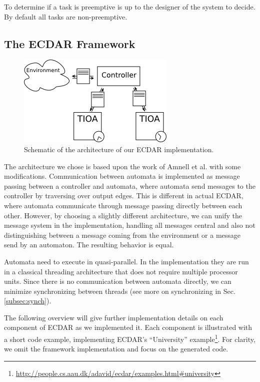 To determine if a task is preemptive is up to the designer of the
system to decide. By default all tasks are non-preemptive.

\subsection{The ECDAR Framework}
\label{implementation-framework}

\begin{figure}[t]
\begin{centering}
\includegraphics[scale=0.8]{images/ecdar_architecture_2.png}
\par\end{centering}

\caption{Schematic of the architecture of our ECDAR implementation.}
\end{figure}

The architecture we chose is based upon the work of Amnell et
al.\cite{amnell_code_2002} with some modifications. Communication between
automata is implemented as message passing between a controller and automata,
where automata send messages to the controller by traversing over output
edges. This is different in actual ECDAR, where automata communicate through
message passing directly between each other. However, by choosing a slightly
different architecture, we can unify the message system in the implementation,
handling all messages central and also not distinguishing between a message
coming from the environment or a message send by an automaton. The resulting
behavior is equal.

Automata need to execute in quasi-parallel. In the implementation they are run
in a classical threading architecture that does not require multiple processor
units. Since there is no communication between automata directly, we can
minimize synchronizing between threads (see more on synchronizing in
Sec. \ref{subsec:synch}).

The following overview will give further implementation details on each
component of ECDAR as we implemented it. Each component is illustrated with a
short code example, implementing ECDAR's ``University''
example\footnote{\url{http://people.cs.aau.dk/adavid/ecdar/examples.html#university}}. For
clarity, we omit the framework implementation and focus on the generated code.

